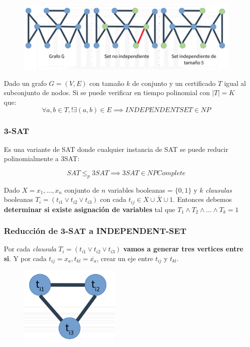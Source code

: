 \documentclass{article}
\begin{document}
\begin{figure}[h!]
    \includegraphics[width=\linewidth]{imagenes/conjunto-independiente.png}
\end{figure}

Dado un grafo \(G=(V,E)\) con tamaño \(k\) de conjunto y un certificado \(T\) igual 
al subconjunto de nodos. Si se puede verificar en tiempo polinomial con \(|T| = K\) que:
\[
    \forall a,b \in T, !\exists (a,b) \in E \implies INDEPENDENTSET \in NP    
\]

\subsubsection{3-SAT}
Es una variante de SAT donde cualquier instancia de SAT se puede reducir polinomialmente a 3SAT:

\[
    SAT \leq_p 3SAT \implies 3SAT \in NPComplete
\]

Dado \(X={x_1,...,x_n}\) conjunto de \(n\) variables booleanas = \(\{0,1\}\) y 
\(k\) \textit{clausulas} booleanas \(T_i=(t_{i1} \lor t_{i2} \lor t_{i3} )\) 
con cada \(t_{ij} \in X \cup \overline{X} \cup {1}\). Entonces debemos 
\textbf{determinar si existe asignación de variables} tal que \(T_1 \land T_2 \land ... \land T_k = 1\)

\newpage
\subsubsection{Reducción de 3-SAT a INDEPENDENT-SET}
Por cada \textit{clausula} \(T_i=(t_{i1} \lor t_{i2} \lor t_{i3} )\) \textbf{vamos a generar tres vertices entre si}.
Y por cada \(t_{ij}=x_a,t_{kl}=\overline{x_a} \), crear un eje entre \(t_{ij}\) y \(t_{kl}\).

\begin{figure}[h!]
    \includegraphics[scale=0.4]{imagenes/reduccion-3sat.png}
\end{figure}
\end{document}

